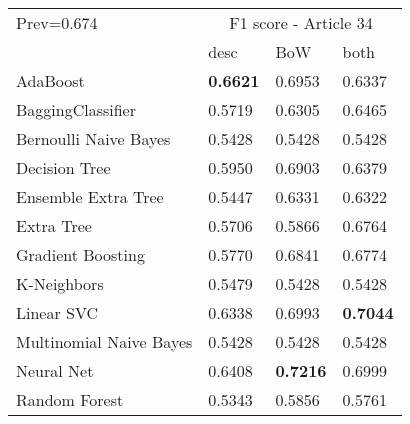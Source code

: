\begin{tabular}{|l|l|l|l| }
\hline
Prev=0.674 &  \multicolumn{3}{c|}{F1 score - Article 34} \\
\cline{2-4} & desc & BoW & both \\ \hline
AdaBoost                & {\bf 0.6621} & 0.6953 & 0.6337\\
BaggingClassifier       & 0.5719 & 0.6305 & 0.6465\\
Bernoulli Naive Bayes   & 0.5428 & 0.5428 & 0.5428\\
Decision Tree           & 0.5950 & 0.6903 & 0.6379\\
Ensemble Extra Tree     & 0.5447 & 0.6331 & 0.6322\\
Extra Tree              & 0.5706 & 0.5866 & 0.6764\\
Gradient Boosting       & 0.5770 & 0.6841 & 0.6774\\
K-Neighbors             & 0.5479 & 0.5428 & 0.5428\\
Linear SVC              & 0.6338 & 0.6993 & {\bf 0.7044}\\
Multinomial Naive Bayes & 0.5428 & 0.5428 & 0.5428\\
Neural Net              & 0.6408 & {\bf 0.7216} & 0.6999\\
Random Forest           & 0.5343 & 0.5856 & 0.5761\\
\hline
\end{tabular}